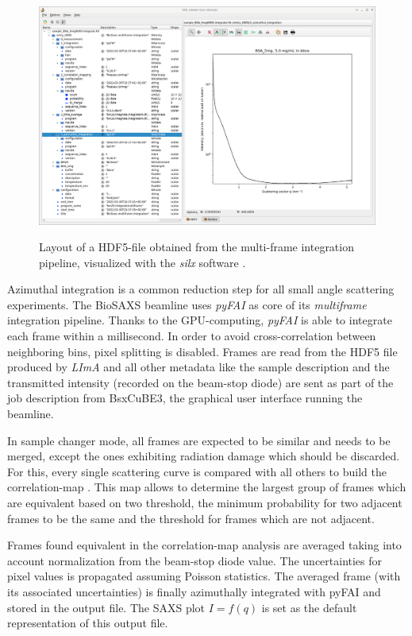 \documentclass[preprint]{iucr}              %
\begin{document}
\begin{figure}
\caption{Layout of a HDF5-file obtained from the multi-frame integration pipeline, visualized with the \textit{silx} software \cite{silx}.}
\includegraphics{multiframe}
\label{multiframe}
\end{figure}

Azimuthal integration is a common reduction step for all small angle scattering experiments. 
The BioSAXS beamline uses \textit{pyFAI} \cite{pyfai_2020} as core of its \textit{multiframe} integration pipeline.
Thanks to the GPU-computing, \textit{pyFAI} is able to integrate each frame within a millisecond.
In order to avoid cross-correlation between neighboring bins, pixel splitting is disabled.
Frames are read from the HDF5 file produced by \textit{LImA} \cite{lima} and all other metadata like the sample description and the transmitted  intensity (recorded on the beam-stop diode) are sent as part of the job description from BsxCuBE3, the graphical user interface running the beamline.

In sample changer mode, all frames are expected to be similar and needs to be merged, except the ones exhibiting radiation damage which should be discarded.
For this, every single scattering curve is compared with all others to build the correlation-map \cite{cormap}. 
This map allows to determine the largest group of frames which are equivalent based on two threshold, the minimum probability for two adjacent frames to be the same and the threshold for frames which are not adjacent. 

Frames found equivalent in the correlation-map analysis are averaged taking into account normalization from the beam-stop diode value. 
The uncertainties for pixel values is propagated assuming Poisson statistics. 
The averaged frame (with its associated uncertainties) is finally azimuthally integrated with pyFAI and stored in the output file. 
The SAXS plot $I = f(q)$ is set as the default representation of this output file.
\end{document}
